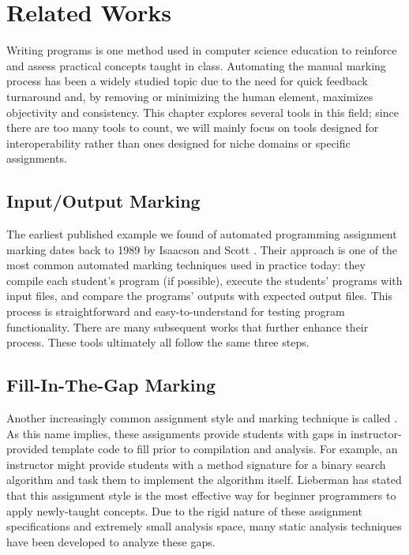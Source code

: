 \chapter{Related Works}
\label{chap:related-works}

Writing programs is one method used in computer science education to reinforce and assess practical concepts taught in class. Automating the manual marking process has been a widely studied topic due to the need for quick feedback turnaround and, by removing or minimizing the human element, maximizes objectivity and consistency. This chapter explores several tools in this field; since there are too many tools to count, we will mainly focus on tools designed for interoperability rather than ones designed for niche domains or specific assignments.

\section{Input/Output Marking}

The earliest published example we found of automated programming assignment marking dates back to 1989 by Isaacson and Scott \cite{isaacson1989automating}. Their approach is one of the most common automated marking techniques used in practice today: they compile each student's program (if possible), execute the students' programs with input files, and compare the programs' outputs with expected output files. This process is straightforward and easy-to-understand for testing program functionality. There are many subsequent works \cite{cheang2003automated, higgins2003coursemarker, jackson1997grading, morris2003automatic, spacco2006experiences} that further enhance their process. These tools ultimately all follow the same three steps.

\section{Fill-In-The-Gap Marking}

Another increasingly common assignment style and marking technique is called . As this name implies, these assignments provide students with gaps in instructor-provided template code to fill prior to compilation and analysis. For example, an instructor might provide students with a method signature for a binary search algorithm and task them to implement the algorithm itself. Lieberman \cite{lieberman1986example} has stated that this assignment style is the most effective way for beginner programmers to apply newly-taught concepts. Due to the rigid nature of these assignment specifications and extremely small analysis space, many static analysis techniques have been developed to analyze these gaps.

